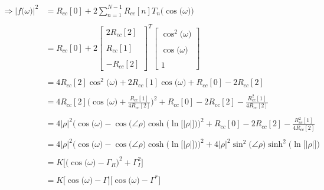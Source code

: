 \documentclass{article}
\begin{document}
\begin{align*}
    \Rightarrow \Big|f\big(\omega\big)\Big|^{2}&= R_{cc}[0] + 2\sum_{n = 1}^{N - 1}R_{cc}[n]T_{n}\Big(\cos\big(\omega\big)\Big) \\ \\
                                               &= R_{cc}[0] + 2\begin{bmatrix}
                                                                   2R_{cc}[2] \\ \\
                                                                    R_{cc}[1] \\ \\
                                                                   -R_{cc}[2]
                                                                 \end{bmatrix}^{T}
                                                               \begin{bmatrix}
                                                                   \cos^{2}\big(\omega\big) \\ \\
                                                                       \cos\big(\omega\big) \\ \\
                                                                                          1
                                                                 \end{bmatrix} \\ \\
                                               &= 4R_{cc}[2]\cos^{2}\big(\omega\big) + 2R_{cc}[1]\cos\big(\omega\big) + R_{cc}[0] - 2R_{cc}[2] \\ \\
                                               &= 4R_{cc}[2]\Bigg(\cos\big(\omega\big) + \frac{R_{cc}[1]}{4R_{cc}[2]}\Bigg)^{2} + R_{cc}[0] - 2R_{cc}[2] - \frac{R_{cc}^{2}[1]}{4R_{cc}[2]} \\ \\
                                               &= 4\big|\rho\big|^{2}\Bigg(\cos\big(\omega\big) - \cos\big(\angle{\rho}\big)\cosh\Big(\ln\big[\big|\rho\big|\big]\Big)\Bigg)^{2} + R_{cc}[0] - 2R_{cc}[2] - \frac{R_{cc}^{2}[1]}{4R_{cc}[2]} \\ \\
                                               &= 4\big|\rho\big|^{2}\Bigg(\cos\big(\omega\big) - \cos\big(\angle{\rho}\big)\cosh\Big(\ln\big[\big|\rho\big|\big]\Big)\Bigg)^{2} + 4\big|\rho\big|^{2}\sin^{2}\big(\angle{\rho}\big)\sinh^{2}\Big(\ln\big[\big|\rho\big|\big]\Big) \\ \\
                                               &= K\bigg[\Big(\cos\big(\omega\big) - \Gamma_{R}\Big)^{2} + \Gamma_{I}^{2}\bigg] \\ \\
                                               &= K\Big[\cos\big(\omega\big) - \Gamma\Big]\Big[\cos\big(\omega\big) - \Gamma^{*}\Big]
  \end{align*}
\end{document}
